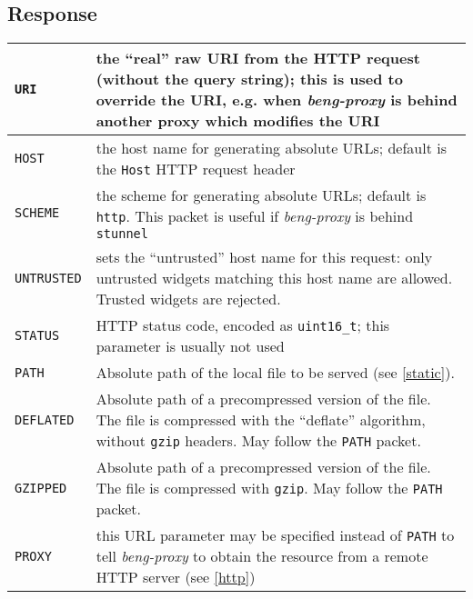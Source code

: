 \documentclass[a4paper,12pt]{article}
\begin{document}
\subsection{Response}

\begin{longtable}{|l|p{8cm}|}

\hline

\verb|URI| & the ``real'' raw URI from the HTTP request (without the
query string); this is used to override the URI, e.g. when
\emph{beng-proxy} is behind another proxy which modifies the URI \\

\hline

\verb|HOST| & the host name for generating absolute URLs; default is
the \texttt{Host} HTTP request header \\

\hline

\verb|SCHEME| & the scheme for generating absolute URLs; default is
\texttt{http}.  This packet is useful if \emph{beng-proxy} is behind
\texttt{stunnel} \\

\hline

\verb|UNTRUSTED| & sets the ``untrusted'' host name for this
request: only untrusted widgets matching this host name are allowed.
Trusted widgets are rejected. \\

\hline
\verb|STATUS| & HTTP status code, encoded as \texttt{uint16\_t};
this parameter is usually not used \\
\hline

\verb|PATH| & Absolute path of the local file to be served (see
\ref{static}). \\

\hline

\verb|DEFLATED| & Absolute path of a precompressed version of the
file.  The file is compressed with the ``deflate'' algorithm, without
\texttt{gzip} headers.  May follow the \verb|PATH| packet. \\

\hline

\verb|GZIPPED| & Absolute path of a precompressed version of the
file.  The file is compressed with \texttt{gzip}.  May follow the
\verb|PATH| packet. \\

\hline

\verb|PROXY| & this URL parameter may be specified instead of
\verb|PATH| to tell \emph{beng-proxy} to obtain the resource from a
remote HTTP server (see \ref{http}) \\


\end{longtable}
\end{document}

